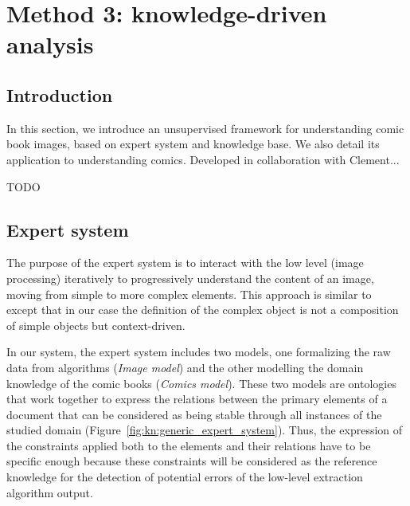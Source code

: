 \chapter{Method 3: knowledge-driven analysis}
\label{chap:knowledge}
\graphicspath{{./chapters/5-knowledge/figs/}}

\section{Introduction}
\label{sec:kn:introduction}

In this section, we introduce an unsupervised framework for understanding comic book images, based on expert system and knowledge base.
We also detail its application to understanding comics.
Developed in collaboration with Clement...

TODO

\section{Expert system} %
\label{sec:kn:expert_system}

The purpose of the expert system is to interact with the low level (image processing) iteratively to progressively understand the content of an image, moving from simple to more complex elements.
This approach is similar to~\cite{Sciascio2011Structured} except that in our case the definition of the complex object is not a composition of simple objects but context-driven.

In our system, the expert system includes two models, one formalizing the raw data from algorithms (\emph{Image model}) and the other modelling the domain knowledge of the comic books (\emph{Comics model}).
These two models are ontologies that work together to
express the relations between the primary elements of a document that can be considered as being stable through all instances of the studied domain (Figure~\ref{fig:kn:generic_expert_system}).
Thus, the expression of the constraints applied both to the elements and their relations have to be specific enough because these constraints will be considered as the reference knowledge for the detection of potential errors of the low-level extraction algorithm output.

